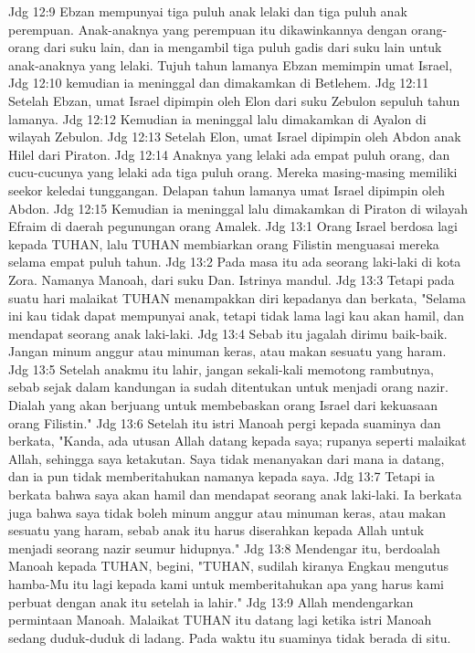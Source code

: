 Jdg 12:9  Ebzan mempunyai tiga puluh anak lelaki dan tiga puluh anak perempuan. Anak-anaknya yang perempuan itu dikawinkannya dengan orang-orang dari suku lain, dan ia mengambil tiga puluh gadis dari suku lain untuk anak-anaknya yang lelaki. Tujuh tahun lamanya Ebzan memimpin umat Israel,
Jdg 12:10  kemudian ia meninggal dan dimakamkan di Betlehem.
Jdg 12:11  Setelah Ebzan, umat Israel dipimpin oleh Elon dari suku Zebulon sepuluh tahun lamanya.
Jdg 12:12  Kemudian ia meninggal lalu dimakamkan di Ayalon di wilayah Zebulon.
Jdg 12:13  Setelah Elon, umat Israel dipimpin oleh Abdon anak Hilel dari Piraton.
Jdg 12:14  Anaknya yang lelaki ada empat puluh orang, dan cucu-cucunya yang lelaki ada tiga puluh orang. Mereka masing-masing memiliki seekor keledai tunggangan. Delapan tahun lamanya umat Israel dipimpin oleh Abdon.
Jdg 12:15  Kemudian ia meninggal lalu dimakamkan di Piraton di wilayah Efraim di daerah pegunungan orang Amalek.
Jdg 13:1  Orang Israel berdosa lagi kepada TUHAN, lalu TUHAN membiarkan orang Filistin menguasai mereka selama empat puluh tahun.
Jdg 13:2  Pada masa itu ada seorang laki-laki di kota Zora. Namanya Manoah, dari suku Dan. Istrinya mandul.
Jdg 13:3  Tetapi pada suatu hari malaikat TUHAN menampakkan diri kepadanya dan berkata, "Selama ini kau tidak dapat mempunyai anak, tetapi tidak lama lagi kau akan hamil, dan mendapat seorang anak laki-laki.
Jdg 13:4  Sebab itu jagalah dirimu baik-baik. Jangan minum anggur atau minuman keras, atau makan sesuatu yang haram.
Jdg 13:5  Setelah anakmu itu lahir, jangan sekali-kali memotong rambutnya, sebab sejak dalam kandungan ia sudah ditentukan untuk menjadi orang nazir. Dialah yang akan berjuang untuk membebaskan orang Israel dari kekuasaan orang Filistin."
Jdg 13:6  Setelah itu istri Manoah pergi kepada suaminya dan berkata, "Kanda, ada utusan Allah datang kepada saya; rupanya seperti malaikat Allah, sehingga saya ketakutan. Saya tidak menanyakan dari mana ia datang, dan ia pun tidak memberitahukan namanya kepada saya.
Jdg 13:7  Tetapi ia berkata bahwa saya akan hamil dan mendapat seorang anak laki-laki. Ia berkata juga bahwa saya tidak boleh minum anggur atau minuman keras, atau makan sesuatu yang haram, sebab anak itu harus diserahkan kepada Allah untuk menjadi seorang nazir seumur hidupnya."
Jdg 13:8  Mendengar itu, berdoalah Manoah kepada TUHAN, begini, "TUHAN, sudilah kiranya Engkau mengutus hamba-Mu itu lagi kepada kami untuk memberitahukan apa yang harus kami perbuat dengan anak itu setelah ia lahir."
Jdg 13:9  Allah mendengarkan permintaan Manoah. Malaikat TUHAN itu datang lagi ketika istri Manoah sedang duduk-duduk di ladang. Pada waktu itu suaminya tidak berada di situ.
